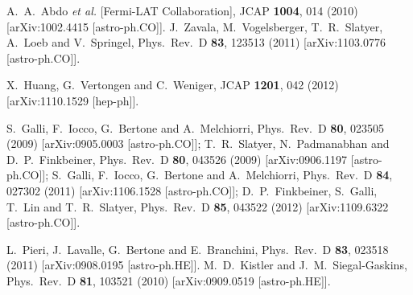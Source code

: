   A.~A.~Abdo {\it et al.}  [Fermi-LAT Collaboration],
  JCAP {\bf 1004}, 014 (2010)
  [arXiv:1002.4415 [astro-ph.CO]].
  J.~Zavala, M.~Vogelsberger, T.~R.~Slatyer, A.~Loeb and V.~Springel,
  Phys.\ Rev.\ D {\bf 83}, 123513 (2011)
  [arXiv:1103.0776 [astro-ph.CO]].

  X.~Huang, G.~Vertongen and C.~Weniger,
  JCAP {\bf 1201}, 042 (2012)
  [arXiv:1110.1529 [hep-ph]].


  S.~Galli, F.~Iocco, G.~Bertone and A.~Melchiorri,
  Phys.\ Rev.\ D {\bf 80}, 023505 (2009)
  [arXiv:0905.0003 [astro-ph.CO]];
  T.~R.~Slatyer, N.~Padmanabhan and D.~P.~Finkbeiner,
  Phys.\ Rev.\ D {\bf 80}, 043526 (2009)
  [arXiv:0906.1197 [astro-ph.CO]];
  S.~Galli, F.~Iocco, G.~Bertone and A.~Melchiorri,
  Phys.\ Rev.\ D {\bf 84}, 027302 (2011)
  [arXiv:1106.1528 [astro-ph.CO]];
  D.~P.~Finkbeiner, S.~Galli, T.~Lin and T.~R.~Slatyer,
  Phys.\ Rev.\ D {\bf 85}, 043522 (2012)
  [arXiv:1109.6322 [astro-ph.CO]].

  L.~Pieri, J.~Lavalle, G.~Bertone and E.~Branchini,
  Phys.\ Rev.\ D {\bf 83}, 023518 (2011)
  [arXiv:0908.0195 [astro-ph.HE]].
  M.~D.~Kistler and J.~M.~Siegal-Gaskins,
  Phys.\ Rev.\ D {\bf 81}, 103521 (2010)
  [arXiv:0909.0519 [astro-ph.HE]].

